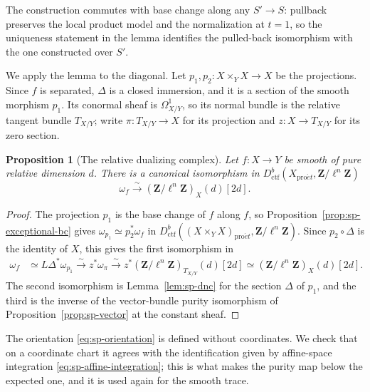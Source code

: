 \documentclass[11pt,a4paper]{article}
\numberwithin{equation}{section}
\newtheorem{proposition}[theorem]{Proposition}
\theoremstyle{definition}
\theoremstyle{remark}
\newcommand{\proet}{\mathrm{pro}\acute{e}t}
\newcommand{\Dctf}{D^b_{\mathrm{ctf}}}
\begin{document}
The construction commutes with base change along any $S'\to S$:
pullback preserves the local product model and the normalization at
$t=1$, so the uniqueness statement in the lemma identifies the
pulled-back isomorphism with the one constructed over $S'$.

We apply the lemma to the diagonal. Let $p_1,p_2:X\times_YX\to X$ be
the projections. Since $f$ is separated, $\Delta$ is a closed immersion,
and it is a section of the smooth morphism $p_1$. Its conormal sheaf is
$\Omega^1_{X/Y}$, so its normal bundle is the relative tangent bundle
$T_{X/Y}$; write $\pi:T_{X/Y}\to X$ for its projection and
$z:X\to T_{X/Y}$ for its zero section.

\begin{proposition}[The relative dualizing complex]
\label{prop:sp-orientation}
Let $f:X\to Y$ be smooth of pure relative dimension $d$. There is a
canonical isomorphism in $\Dctf(X_{\proet},\mathbf Z/\ell^n\mathbf Z)$
\begin{equation}\label{eq:sp-orientation}
 \omega_{f}\xrightarrow{\sim}(\mathbf Z/\ell^n\mathbf Z)_{X}(d)[2d].
\end{equation}
\end{proposition}
\begin{proof}
The projection $p_1$ is the base change of $f$ along $f$, so
Proposition~\ref{prop:sp-exceptional-bc} gives
$\omega_{p_1}\simeq p_2^{*}\omega_f$ in
$\Dctf((X\times_YX)_{\proet},\mathbf Z/\ell^n\mathbf Z)$. Since $p_2\circ\Delta$ is the
identity of $X$, this gives the first isomorphism in
\begin{align*}
 \omega_{f}
  &\simeq L\Delta^{*}\omega_{p_1}
  \xrightarrow{\sim}z^{*}\omega_{\pi}
  \xrightarrow{\sim}z^{*}(\mathbf Z/\ell^n\mathbf Z)_{T_{X/Y}}(d)[2d]
  \simeq(\mathbf Z/\ell^n\mathbf Z)_{X}(d)[2d].
\end{align*}
The second isomorphism is Lemma~\ref{lem:sp-dnc} for the section
$\Delta$ of $p_1$, and the third is the inverse of the vector-bundle
purity isomorphism of Proposition~\ref{prop:sp-vector} at the constant
sheaf.
\end{proof}

The orientation \eqref{eq:sp-orientation} is defined without
coordinates. We check that on a coordinate chart it agrees with the
identification given by affine-space integration
\eqref{eq:sp-affine-integration}; this is what makes the purity map
below the expected one, and it is used again for the smooth trace.
\end{document}
